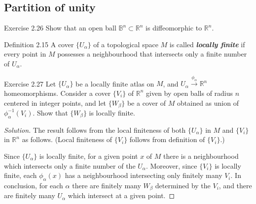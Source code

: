 \subsection{Partition of unity}

\begin{thing4}{Exercise 2.26}\label{exer:2.26}\leavevmode
Show that an open ball \(\mathbb{B}^n \subset \mathbb{R}^n\) is diffeomorphic to \(\mathbb{R}^n\).
\end{thing4}

\begin{thing4}{Definition 2.15}\label{def:2.15}\leavevmode
A cover \(\{U_\alpha\}\) of a topological space \(M\) is called \textit{\textbf{locally finite}} if every point in \(M\) possesses a neighbourhood that intersects only a finite number of \(U_\alpha\).
\end{thing4}

\begin{thing4}{Exercise 2.27}\label{exer:2.27}\leavevmode
Let \(\{U_\alpha\}\) be a locally finite atlas on \(M\), and \(U_\alpha\xrightarrow{\phi_\alpha}\mathbb{R}^n\) homeomorphisms. Consider a cover \(\{V_i\}\) of \( \mathbb{R}^n\) given by open balls of radius $n$ centered in integer points, and let \(\{ W_\beta\}\) be a cover of \(M\) obtained as union of \(\phi^{-1}_\alpha(V_i)\). Show that \(\{W_\beta\}\) is locally finite.
\end{thing4}

\begin{proof}[Solution]\leavevmode
 The result follows from the local finiteness of both \(\{U_\alpha\}\) in \(M\) and \(\{V_i\}\) in \(\mathbb{R}^n\) as follows. (Local finiteness of \(\{V_i\}\) follows from definition of \(\{V_i\}\).)

Since \(\{U_\alpha\}\) is locally finite, for a given point $x$ of \(M\) there is a neighbourhood which intersects only a finite number of the \(U_\alpha\). Moreover, since  \(\{V_i\}\) is locally finite, each \(\phi_\alpha(x)\) has a neighbourhood intersecting only finitely many \(V_i\). In conclusion, for each \(\alpha\) there are finitely many \(W_\beta\) determined by the \(V_i\), and there are finitely many \(U_\alpha\) which intersect at a given point.
\end{proof}

